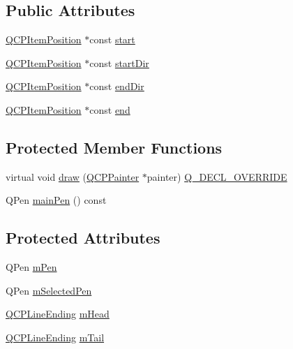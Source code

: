 \subsection*{Public Attributes}
\begin{DoxyCompactItemize}
\item 
\mbox{\hyperlink{class_q_c_p_item_position}{Q\+C\+P\+Item\+Position}} $\ast$const \mbox{\hyperlink{class_q_c_p_item_curve_a20c3b5ea31c33764f4f30c2ec7ae518b}{start}}
\item 
\mbox{\hyperlink{class_q_c_p_item_position}{Q\+C\+P\+Item\+Position}} $\ast$const \mbox{\hyperlink{class_q_c_p_item_curve_aa124bf66c09cc51c627fb49db8bf8a7b}{start\+Dir}}
\item 
\mbox{\hyperlink{class_q_c_p_item_position}{Q\+C\+P\+Item\+Position}} $\ast$const \mbox{\hyperlink{class_q_c_p_item_curve_a28181a9dee9cc3c3da83a883221bd2d0}{end\+Dir}}
\item 
\mbox{\hyperlink{class_q_c_p_item_position}{Q\+C\+P\+Item\+Position}} $\ast$const \mbox{\hyperlink{class_q_c_p_item_curve_a24ecbb195b32a08b42b61c2cf08a1b4d}{end}}
\end{DoxyCompactItemize}
\subsection*{Protected Member Functions}
\begin{DoxyCompactItemize}
\item 
virtual void \mbox{\hyperlink{class_q_c_p_item_curve_a856ae61de18278847ba5e0e357bf68f2}{draw}} (\mbox{\hyperlink{class_q_c_p_painter}{Q\+C\+P\+Painter}} $\ast$painter) \mbox{\hyperlink{qcustomplot_8h_a42cc5eaeb25b85f8b52d2a4b94c56f55}{Q\+\_\+\+D\+E\+C\+L\+\_\+\+O\+V\+E\+R\+R\+I\+DE}}
\item 
Q\+Pen \mbox{\hyperlink{class_q_c_p_item_curve_a3a3a84518e8701211c8c5a40bf3c911f}{main\+Pen}} () const
\end{DoxyCompactItemize}
\subsection*{Protected Attributes}
\begin{DoxyCompactItemize}
\item 
Q\+Pen \mbox{\hyperlink{class_q_c_p_item_curve_a7ef92988d1db2e4d0311e34c0a57fe42}{m\+Pen}}
\item 
Q\+Pen \mbox{\hyperlink{class_q_c_p_item_curve_ab22cbab261b20be5aa8e4ca252149246}{m\+Selected\+Pen}}
\item 
\mbox{\hyperlink{class_q_c_p_line_ending}{Q\+C\+P\+Line\+Ending}} \mbox{\hyperlink{class_q_c_p_item_curve_af2cc26ff199570940dc96f5ec19a13f8}{m\+Head}}
\item 
\mbox{\hyperlink{class_q_c_p_line_ending}{Q\+C\+P\+Line\+Ending}} \mbox{\hyperlink{class_q_c_p_item_curve_af1dca285b97e3f5b892dab827a79f327}{m\+Tail}}
\end{DoxyCompactItemize}
